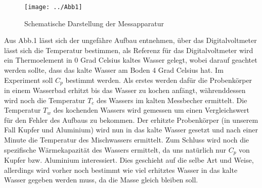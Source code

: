 \begin{figure}[h]
\centering
\texttt{[image: ../Abb1]}
\caption{Schematische Darstellung der Messapparatur}
\label{}
\end{figure}

Aus Abb.1 lässt sich der ungefähre Aufbau entnehmen, über das Digitalvoltmeter lässt sich die Temperatur bestimmen, als Referenz für das Digitalvoltmeter wird ein Thermoelement in 0 Grad Celsius kaltes Wasser gelegt, wobei darauf geachtet werden sollte, dass das kalte Wasser am Boden 4 Grad Celsius hat.
Im Experiment soll $C_p$ bestimmt werden.
Als erstes werden dafür die Probenkörper in einem Wasserbad erhitzt bis
das Wasser zu kochen anfängt, währenddessen wird noch die Temperatur $T_c$ des Wassers im kalten Messbecher ermittelt. Die Temperatur $T_w$ des kochenden Wassers wird gemessen um einen Vergleichswert für den Fehler des Aufbaus zu bekommen.
Der erhitzte Probenkörper (in unserem Fall Kupfer und Aluminium) wird nun in das kalte Wasser gesetzt und nach einer Minute die Temperatur des Mischwassers ermittelt.
Zum Schluss wird noch die spezifische Wärmekapazität des Wassers ermittelt, da uns natürlich nur $C_p$ von Kupfer bzw. Aluminium interessiert. Dies geschieht auf die selbe Art und Weise, allerdings wird vorher noch bestimmt wie viel erhitztes Wasser in das kalte Wasser gegeben werden muss, da die Masse gleich bleiben soll.
